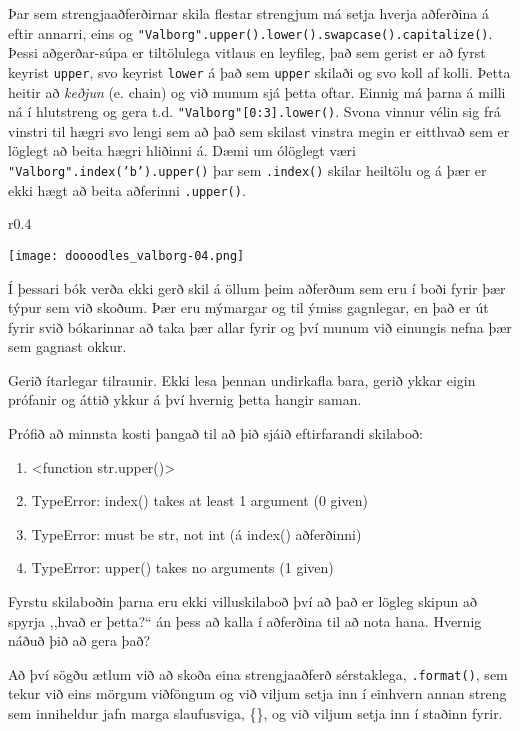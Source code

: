 Þar sem strengjaaðferðirnar skila flestar strengjum má setja hverja aðferðina á eftir annarri, eins og \texttt{"Valborg".upper().lower().swapcase().capitalize()}.
Þessi aðgerðar-súpa er tiltölulega vitlaus en leyfileg, það sem gerist er að fyrst keyrist \texttt{upper}, svo keyrist \texttt{lower} á það sem \texttt{upper} skilaði og svo koll af kolli.
Þetta heitir að \textit{keðjun} (e. chain) og við munum sjá þetta oftar.
Einnig má þarna á milli ná í hlutstreng og gera t.d. \texttt{"Valborg"[0:3].lower()}.
Svona vinnur vélin sig frá vinstri til hægri svo lengi sem að það sem skilast vinstra megin er eitthvað sem er löglegt að beita hægri hliðinni á.
Dæmi um ólöglegt væri \texttt{"Valborg".index('b').upper()} þar sem \texttt{.index()} skilar heiltölu og á þær er ekki hægt að beita aðferinni \texttt{.upper()}.

\begin{wrapfigure}{r}{0.4\textwidth}
	\begin{center}
		\texttt{[image: doooodles\_valborg-04.png]}
	\end{center}
\end{wrapfigure}

Í þessari bók verða ekki gerð skil á öllum þeim aðferðum sem eru í boði fyrir þær týpur sem við skoðum.
Þær eru mýmargar og til ýmiss gagnlegar, en það er út fyrir svið bókarinnar að taka þær allar fyrir og því munum við einungis nefna þær sem gagnast okkur.

Gerið ítarlegar tilraunir.
Ekki lesa þennan undirkafla bara, gerið ykkar eigin prófanir og áttið ykkur á því hvernig þetta hangir saman.


Prófið að minnsta kosti þangað til að þið sjáið eftirfarandi skilaboð:
\begin{enumerate}
	\item <function str.upper()> 
	\item TypeError: index() takes at least 1 argument (0 given)
	\item TypeError: must be str, not int (á index() aðferðinni)
	\item TypeError: upper() takes no arguments (1 given)
\end{enumerate}

Fyrstu skilaboðin þarna eru ekki villuskilaboð því að það er lögleg skipun að spyrja ,,hvað er þetta?“ án þess að kalla í aðferðina til að nota hana.
Hvernig náðuð þið að gera það? 


Að því sögðu ætlum við að skoða eina strengjaaðferð sérstaklega, \texttt{.format()}, sem tekur við eins mörgum viðföngum og við viljum setja inn í einhvern annan streng sem inniheldur jafn marga slaufusviga, \{\}, og við viljum setja inn í staðinn fyrir.

